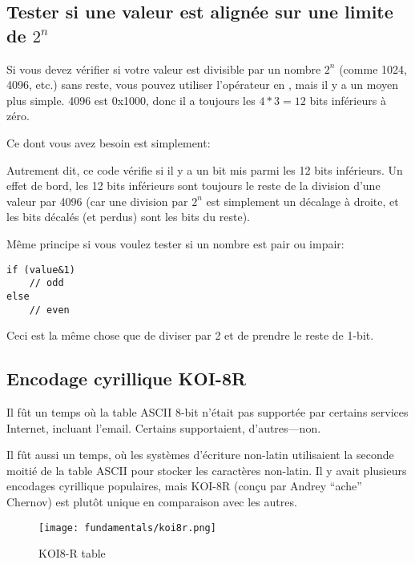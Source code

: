 
\subsection{Tester si une valeur est alignée sur une limite de $2^n$}

Si vous devez vérifier si votre valeur est divisible par un nombre $2^n$ (comme 1024,
4096, etc.) sans reste, vous pouvez utiliser l'opérateur \TT{\%} en \CCpp, mais il
y a un moyen plus simple.
4096 est 0x1000, donc il a toujours les $4*3=12$ bits inférieurs à zéro.

Ce dont vous avez besoin est simplement:



Autrement dit, ce code vérifie si il y a un bit mis parmi les 12 bits inférieurs.
Un effet de bord, les 12 bits inférieurs sont toujours le reste de la division d'une
valeur par 4096 (car une division par $2^n$ est simplement un décalage à droite, et
les bits décalés (et perdus) sont les bits du reste).

Même principe si vous voulez tester si un nombre est pair ou impair:

\begin{lstlisting}[style=customc]
if (value&1)
	// odd
else
	// even
\end{lstlisting}

Ceci est la même chose que de diviser par 2 et de prendre le reste de 1-bit.

\subsection{Encodage cyrillique KOI-8R}

Il fût un temps où la table \ac{ASCII} 8-bit n'était pas supportée par certains services
Internet, incluant l'email.
Certains supportaient, d'autres---non.

Il fût aussi un temps, où les systèmes d'écriture non-latin utilisaient la seconde
moitié de la table ASCII pour stocker les caractères non-latin.
Il y avait plusieurs encodages cyrillique populaires, mais KOI-8R (conçu par Andrey
``ache'' Chernov) est plutôt unique en comparaison avec les autres.

\begin{figure}[H]
\centering
\texttt{[image: fundamentals/koi8r.png]}
\caption{KOI8-R table}
\end{figure}

